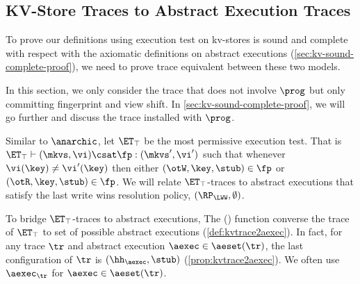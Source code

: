 \subsection{KV-Store Traces to Abstract Execution Traces}
\label{sec:kvtrace2aexec}

To prove our definitions using execution test on kv-stores 
is sound and complete with respect with the axiomatic definitions on abstract executions (\cref{sec:kv-sound-complete-proof}),
we need to prove trace equivalent between these two models.

In this section, we only consider the trace that does not involve \( \prog \) but only committing fingerprint and view shift.
In \cref{sec:kv-sound-complete-proof}, we will go further and discuss the trace installed with \( \prog \).

Similar to \(\anarchic\), let $\ET_\top$ be the most permissive execution test.
That is $\ET_\top \vdash (\mkvs, \vi) \csat \fp: (\mkvs',\vi')$ 
such that whenever $\vi(\key) \neq \vi'(\key)$ then either $(\otW, \key, \stub) \in \fp$ or $(\otR, \key, \stub) \in \fp$.
We will relate $\ET_{\top}$-traces to abstract executions that satisfy the last write wins resolution policy, \ie \( (\RP_{\LWW}, \emptyset) \).

To bridge $\ET_{\top}$-traces to abstract executions, 
The \aeset(\tr) function converse the trace of \( \ET_\top \) to set of possible abstract executions (\cref{def:kvtrace2aexec}).
In fact, for any trace \( \tr \) and abstract execution $\aexec \in \aeset(\tr)$, 
the last configuration of $\tr$ is $(\hh_{\aexec}, \stub)$ (\cref{prop:kvtrace2aexec}).
We often use \( \aexec_\tr \) for \( \aexec \in \aeset(\tr) \).

